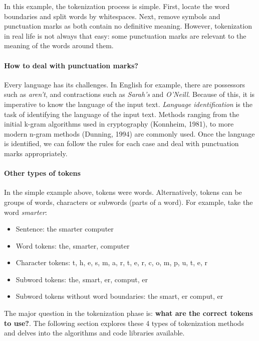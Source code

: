 In this example, the tokenization process is simple. First, locate the word boundaries and split words by whitespaces. Next, remove symbols and punctuation marks as both contain no definitive meaning. However, tokenization in real life is not always that easy: some punctuation marks are relevant to the meaning of the words around them.

\paragraph{How to deal with punctuation marks?}

Every language has its challenges. In English for example, there are possessors such as \emph{aren't}, and contractions such as \emph{Sarah's} and \emph{O'Neill}. Because of this, it is imperative to know the language of the input text. \textit{Language identification} is the task of identifying the language of the input text. Methods ranging from the initial k-gram algorithms used in cryptography (Konnheim, 1981), to more modern n-gram methods (Dunning, 1994) are commonly used. Once the language is identified, we can follow the rules for each case and deal with punctuation marks appropriately.

\paragraph{Other types of tokens}

In the simple example above, tokens were words. Alternatively, tokens can be groups of words, characters or subwords (parts of a word). For example, take the word \emph{smarter}:

\begin{itemize}
    \item Sentence: the smarter computer
    \item Word tokens: the, smarter, computer
    \item Character tokens: t, h, e, s, m, a, r, t, e, r, c, o, m, p, u, t, e, r
    \item Subword tokens: the, smart, er, comput, er
    \item Subword tokens without word boundaries: the smart, er comput, er
\end{itemize}

The major question in the tokenization phase is: \textbf{what are the correct tokens to use?}. The following section explores these 4 types of tokenization methods and delves into the algorithms and code libraries available.

